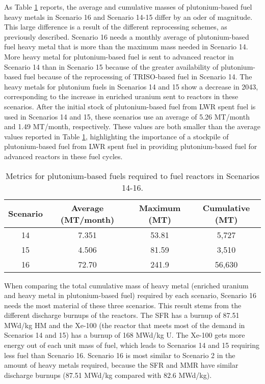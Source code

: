 As Table \ref{tab:s14-16_mox} reports, the average and cumulative 
masses of plutonium-based fuel heavy metals in Scenario 16 and 
Scenario 14-15 differ by an oder of magnitude. This large difference 
is a result of the different reprocessing schemes, as previously 
described. 
Scenario 16 needs a monthly average 
of plutonium-based fuel heavy metal that is more than the maximum mass 
needed in Scenario 14. More heavy metal for plutonium-based fuel
is sent to advanced reactor in Scenario 14 than  
in Scenario 15 because of the greater availability of 
plutonium-based fuel because of the reprocessing of 
\gls{TRISO}-based fuel in Scenario 14. The heavy metals for plutonium fuels 
in Scenarios 14 and 15 show a decrease in 2043, corresponding 
to the increase in enriched uranium sent to reactors in these 
scenarios. After the initial stock of plutonium-based fuel 
from \gls{LWR} spent fuel is used in Scenarios 14 and 15, these 
scenarios use an 
average of 5.26 MT/month and 1.49 MT/month, respectively. These 
values are both smaller than the average values reported 
in Table \ref{tab:s14-16_mox}, highlighting the importance 
of a stockpile of plutonium-based fuel from \gls{LWR} spent 
fuel in providing plutonium-based fuel for advanced reactors in these fuel 
cycles. 

\begin{table}[h!]
    \centering 
    \caption{Metrics for plutonium-based fuels required to fuel reactors 
    in Scenarios 14-16.}
    \label{tab:s14-16_mox}
    \begin{tabular}{c c c c}
        \hline 
        Scenario & Average (MT/month) & Maximum (MT) & Cumulative (MT) \\
        \hline 
        14 & 7.351 & 53.81 & 5,727 \\
        15 & 4.506 & 81.59 & 3,510 \\
        16 & 72.70 & 241.9 & 56,630 \\
        \hline
        
    \end{tabular}
\end{table}

When comparing the total cumulative mass of heavy metal (enriched 
uranium and heavy metal in plutonium-based fuel) required by each scenario,
Scenario 16 needs the most material of these three scenarios. This 
result stems from the different discharge burnups of the reactors. The 
\gls{SFR} has a burnup of 87.51 MWd/kg HM and the Xe-100 (the reactor that 
meets most of the demand in Scenarios 14 and 15) has a burnup of 168 MWd/kg U. 
The Xe-100 gets more energy out of each unit mass of fuel, which leads to 
Scenarios 14 and 15 requiring less fuel than Scenario 16. Scenario 16 is most 
similar to Scenario 2 in the amount of heavy metals required, because
the \gls{SFR} and \gls{MMR} have similar discharge burnups (87.51 MWd/kg 
compared with 82.6 MWd/kg).

